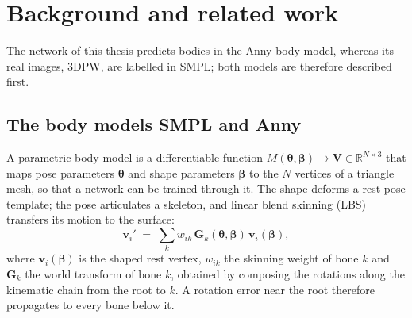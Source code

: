 
\chapter{Background and related work}
\label{ch:background}

The network of this thesis predicts bodies in the Anny body model, whereas its real images, 3DPW, are labelled in
SMPL; both models are therefore described first.

\section{The body models SMPL and Anny}
\label{sec:bg-bodymodels}

A parametric body model is a differentiable function
$M(\boldsymbol{\theta},\boldsymbol{\beta}) \rightarrow \mathbf{V}\in\mathbb{R}^{N\times 3}$ that maps pose parameters
$\boldsymbol{\theta}$ and shape parameters $\boldsymbol{\beta}$ to the $N$ vertices of a triangle mesh, so that a
network can be trained through it. The shape deforms a rest-pose template; the pose articulates a skeleton, and linear
blend skinning (LBS) transfers its motion to the surface:
\begin{equation}
  \mathbf{v}_i' \;=\; \sum_{k} w_{ik}\, \mathbf{G}_k(\boldsymbol{\theta},\boldsymbol{\beta})\, \mathbf{v}_i(\boldsymbol{\beta}),
  \label{eq:bg-lbs}
\end{equation}
where $\mathbf{v}_i(\boldsymbol{\beta})$ is the shaped rest vertex, $w_{ik}$ the skinning weight of bone $k$ and
$\mathbf{G}_k$ the world transform of bone $k$, obtained by composing the rotations along the kinematic chain from the
root to $k$. A rotation error near the root therefore propagates to every bone below it.

